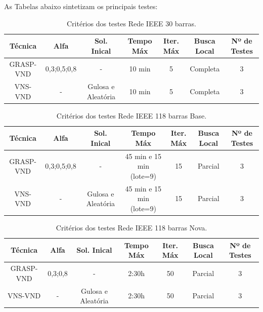 \documentclass[12pt]{article}
\begin{document}
As Tabelas abaixo sintetizam os principais testes: 

\begin{table}[H]
	\centering
	\caption{Critérios dos testes Rede IEEE 30 barras.}
	\begin{tabular}{|c|c|c|c|c|c|c|}
		\hline
		\textbf{Técnica} & \textbf{Alfa} & \textbf{Sol. Inical} & \textbf{Tempo Máx} & \textbf{Iter. Máx} & \textbf{Busca Local} & \textbf{Nº de Testes} \\
		\hline
		GRASP-VND & 0,3;0,5;0,8 & -     & 10 min & 5    & Completa & 3 \\
		\hline
		VNS-VND & -     & Gulosa e Aleatória & 10 min & 5    & Completa & 3 \\
		\hline
	\end{tabular}%
	\label{tab1}%
\end{table}%


\begin{table}[H]
	\centering
	\caption{Critérios dos testes Rede IEEE 118 barras Base.}
	\begin{tabular}{|c|c|c|c|c|c|c|}
		\hline
		\textbf{Técnica} & \textbf{Alfa} & \textbf{Sol. Inical} & \textbf{Tempo Máx} & \textbf{Iter. Máx} & \textbf{Busca Local} & \textbf{Nº de Testes} \\
		\hline
		GRASP-VND & 0,3;0,5;0,8 & -     & 45 min e 15 min (lote=9) & 15    & Parcial & 3 \\
		\hline
		VNS-VND & -     & Gulosa e Aleatória & 45 min e 15 min (lote=9) & 15    & Parcial & 3 \\
		\hline
	\end{tabular}%
	\label{tab2}%
\end{table}%

\begin{table}[H]
	\centering
	\caption{Critérios dos testes Rede IEEE 118 barras Nova.}
	\begin{tabular}{|c|c|c|c|c|c|c|}
		\hline
		\textbf{Técnica} & \textbf{Alfa} & \textbf{Sol. Inical} & \textbf{Tempo Máx} & \textbf{Iter. Máx} & \textbf{Busca Local} & \textbf{Nº de Testes} \\
		\hline
		GRASP-VND & 0,3;0,8   & -     & 2:30h & 50    & Parcial & 3 \\
		\hline
		VNS-VND & -     & Gulosa e Aleatória & 2:30h & 50    & Parcial & 3 \\
		\hline
	\end{tabular}%
	\label{tab3}%
\end{table}%
\end{document}
